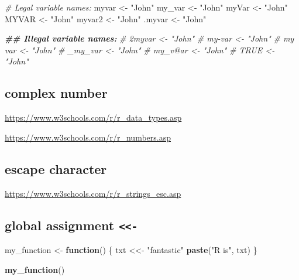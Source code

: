 \documentclass[
]{book}
\newenvironment{Shaded}{\begin{snugshade}}{\end{snugshade}}
\newcommand{\CommentTok}[1]{\textcolor[rgb]{0.56,0.35,0.01}{\textit{#1}}}
\newcommand{\ControlFlowTok}[1]{\textcolor[rgb]{0.13,0.29,0.53}{\textbf{#1}}}
\newcommand{\DocumentationTok}[1]{\textcolor[rgb]{0.56,0.35,0.01}{\textbf{\textit{#1}}}}
\newcommand{\FunctionTok}[1]{\textcolor[rgb]{0.13,0.29,0.53}{\textbf{#1}}}
\newcommand{\NormalTok}[1]{#1}
\newcommand{\OtherTok}[1]{\textcolor[rgb]{0.56,0.35,0.01}{#1}}
\newcommand{\StringTok}[1]{\textcolor[rgb]{0.31,0.60,0.02}{#1}}
\theoremstyle{definition}
\theoremstyle{definition}
\theoremstyle{definition}
\theoremstyle{definition}
\theoremstyle{remark}
\begin{document}
\begin{Shaded}
\begin{Highlighting}[]
\CommentTok{\# Legal variable names:}
\NormalTok{myvar }\OtherTok{\textless{}{-}} \StringTok{"John"}
\NormalTok{my\_var }\OtherTok{\textless{}{-}} \StringTok{"John"}
\NormalTok{myVar }\OtherTok{\textless{}{-}} \StringTok{"John"}
\NormalTok{MYVAR }\OtherTok{\textless{}{-}} \StringTok{"John"}
\NormalTok{myvar2 }\OtherTok{\textless{}{-}} \StringTok{"John"}
\NormalTok{.myvar }\OtherTok{\textless{}{-}} \StringTok{"John"}

\DocumentationTok{\#\# Illegal variable names:}
\CommentTok{\# 2myvar \textless{}{-} "John"}
\CommentTok{\# my{-}var \textless{}{-} "John"}
\CommentTok{\# my var \textless{}{-} "John"}
\CommentTok{\# \_my\_var \textless{}{-} "John"}
\CommentTok{\# my\_v@ar \textless{}{-} "John"}
\CommentTok{\# TRUE \textless{}{-} "John"}
\end{Highlighting}
\end{Shaded}

\hypertarget{complex-number}{%
\subsection{complex number}\label{complex-number}}

\url{https://www.w3schools.com/r/r_data_types.asp}

\url{https://www.w3schools.com/r/r_numbers.asp}

\hypertarget{escape-character}{%
\subsection{escape character}\label{escape-character}}

\url{https://www.w3schools.com/r/r_strings_esc.asp}

\hypertarget{global-assignment--}{%
\subsection{\texorpdfstring{global assignment \texttt{\textless{}\textless{}-}}{global assignment \textless\textless-}}\label{global-assignment--}}

\begin{Shaded}
\begin{Highlighting}[]
\NormalTok{my\_function }\OtherTok{\textless{}{-}} \ControlFlowTok{function}\NormalTok{() \{}
\NormalTok{txt }\OtherTok{\textless{}\textless{}{-}} \StringTok{"fantastic"}
  \FunctionTok{paste}\NormalTok{(}\StringTok{"R is"}\NormalTok{, txt)}
\NormalTok{\}}

\FunctionTok{my\_function}\NormalTok{()}
\end{Highlighting}
\end{Shaded}
\end{document}
